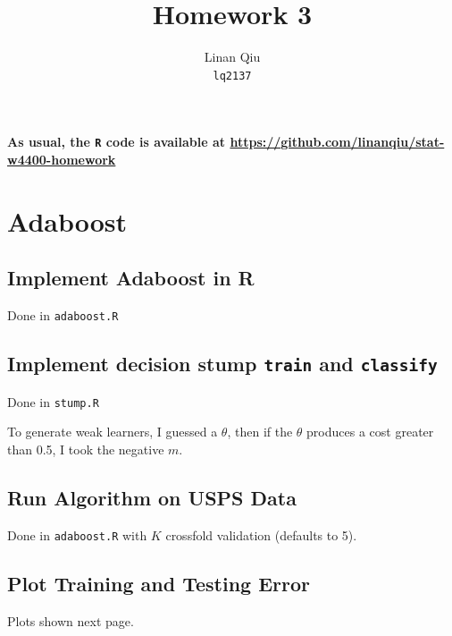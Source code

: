\documentclass[11pt]{scrartcl}
\title{Homework 3}
\author{Linan Qiu\\\texttt{lq2137}}
\begin{document}
\maketitle

\textbf{As usual, the \texttt{R} code is available at \url{https://github.com/linanqiu/stat-w4400-homework}}

\section{Adaboost}

\subsection{Implement Adaboost in R}

Done in \texttt{adaboost.R}

\subsection{Implement decision stump \texttt{train} and \texttt{classify}}

Done in \texttt{stump.R}

To generate weak learners, I guessed a $\theta$, then if the $\theta$ produces a cost greater than 0.5, I took the negative $m$.

\subsection{Run Algorithm on USPS Data}

Done in \texttt{adaboost.R} with $K$ crossfold validation (defaults to 5).

\subsection{Plot Training and Testing Error}

Plots shown next page.
\end{document}
